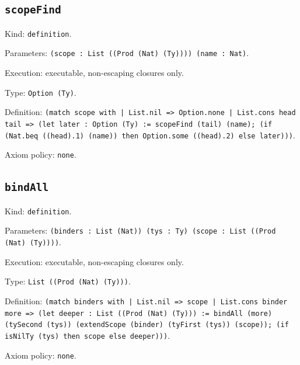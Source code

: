 \documentclass[11pt]{article}
\begin{document}
\subsection*{\texttt{scopeFind}}
\noindent Kind: \texttt{definition}.\par
\noindent Parameters: \texttt{(scope : List ((Prod (Nat) (Ty)))) (name : Nat)}.\par
\noindent Execution: executable, non-escaping closures only.\par
\noindent Type: \texttt{Option (Ty)}.\par
\noindent Definition: \texttt{(match scope with | List.nil => Option.none | List.cons head tail => (let later : Option (Ty) := scopeFind (tail) (name); (if (Nat.beq ((head).1) (name)) then Option.some ((head).2) else later)))}.\par
\noindent Axiom policy: \texttt{none}.\par
\subsection*{\texttt{bindAll}}
\noindent Kind: \texttt{definition}.\par
\noindent Parameters: \texttt{(binders : List (Nat)) (tys : Ty) (scope : List ((Prod (Nat) (Ty))))}.\par
\noindent Execution: executable, non-escaping closures only.\par
\noindent Type: \texttt{List ((Prod (Nat) (Ty)))}.\par
\noindent Definition: \texttt{(match binders with | List.nil => scope | List.cons binder more => (let deeper : List ((Prod (Nat) (Ty))) := bindAll (more) (tySecond (tys)) (extendScope (binder) (tyFirst (tys)) (scope)); (if isNilTy (tys) then scope else deeper)))}.\par
\noindent Axiom policy: \texttt{none}.\par
\end{document}
